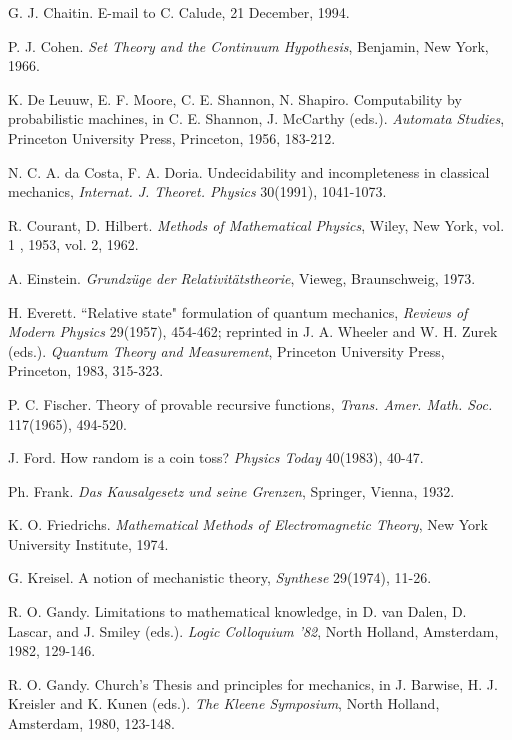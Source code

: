 \begin{thebibliography}{99999}
G. J. Chaitin. E-mail to C. Calude, 21 December, 1994.

P. J. Cohen. {\em Set Theory and the Continuum
Hypothesis}, Benjamin, New
York, 1966.


K. De Leuuw, E. F. Moore, C. E. Shannon, N. Shapiro. Computability by
probabilistic machines, in C. E. Shannon, J. McCarthy (eds.). {\it
Automata Studies}, Princeton University Press, Princeton, 1956, 183-212.

N. C. A. da Costa, F. A. Doria.
Undecidability and incompleteness in
classical mechanics, {\em Internat. J. Theoret. Physics} 30(1991), 1041-1073.




  R. Courant, D. Hilbert. {\it Methods of Mathematical Physics},
 Wiley, New York, vol. 1 , 1953, vol. 2, 1962.

A. Einstein.
{\it  Grundz\"uge der Relativit\"atstheorie},
Vieweg, Braunschweig, 1973.

H. Everett. ``Relative state" formulation of
quantum mechanics,  {\it Reviews of  Modern  Physics}  29(1957), 454-462;
reprinted in
 J. A. Wheeler and W. H. Zurek (eds.).  {\it
 Quantum Theory and Measurement},
 Princeton University Press, Princeton, 1983, 315-323.


P. C. Fischer. Theory of provable recursive functions,
{\it Trans. Amer. Math. Soc. } 117(1965), 494-520.

 J. Ford. How random is a coin toss? {\it  Physics Today}  40(1983), 40-47.


Ph. Frank. {\it  Das Kausalgesetz und seine Grenzen},
Springer, Vienna,  1932.


  K. O. Friedrichs. {\it  Mathematical Methods of
Electromagnetic Theory},  New York University Institute, 1974.


G. Kreisel. A notion of mechanistic theory, {\it Synthese} 29(1974), 11-26.

R. O. Gandy.  Limitations to mathematical knowledge,
in  D. van Dalen, D. Lascar, and
J. Smiley (eds.). {\it Logic Colloquium '82},  North Holland, Amsterdam,
1982, 129-146.

R. O. Gandy.  Church's Thesis and principles for mechanics,
in J. Barwise, H. J. Kreisler and
K. Kunen  (eds.). {\it  The Kleene Symposium}, North Holland, Amsterdam,
1980, 123-148.


\end{thebibliography}
